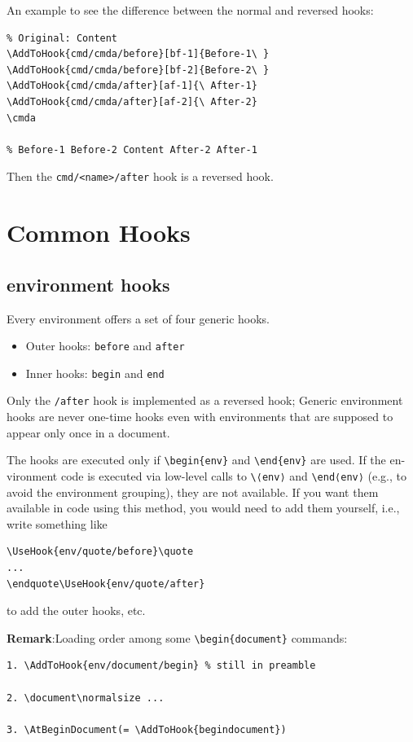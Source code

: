 \documentclass{article}
\newcommand\tbh{\textbackslash}
\newcommand\cmda{Content}
\begin{document}
An example to see the difference between the normal and reversed hooks:
\begin{lstlisting}
% Original: Content
\AddToHook{cmd/cmda/before}[bf-1]{Before-1\ }
\AddToHook{cmd/cmda/before}[bf-2]{Before-2\ }
\AddToHook{cmd/cmda/after}[af-1]{\ After-1}
\AddToHook{cmd/cmda/after}[af-2]{\ After-2}
\cmda

% Before-1 Before-2 Content After-2 After-1
\end{lstlisting}

Then the \texttt{cmd/<name>/after} hook is a reversed hook.

\section{Common Hooks}
\subsection{environment hooks}
Every environment offers a set of four generic hooks. 
\begin{itemize}
  \item Outer hooks: \texttt{before} and \texttt{after}
  \item Inner hooks: \texttt{begin} and \texttt{end}
\end{itemize}

Only the \texttt{/after} hook is implemented as a reversed hook; Generic environment hooks are never one-time
hooks even with environments that are supposed to appear only once in a document.

The hooks are executed only if \texttt{\tbh begin\{env\}} and \texttt{\tbh end\{env\}} are used. If the en-
vironment code is executed via low-level calls to \texttt{\tbh⟨env⟩} and \texttt{\tbh end⟨env⟩} (e.g., to avoid
the environment grouping), they are not available. If you want them available in code
using this method, you would need to add them yourself, i.e., write something like
\begin{lstlisting}
\UseHook{env/quote/before}\quote
...
\endquote\UseHook{env/quote/after}
\end{lstlisting}

to add the outer hooks, etc.

\textbf{Remark}:Loading order among some \verb|\begin{document}| commands:
\begin{lstlisting}
1. \AddToHook{env/document/begin} % still in preamble

2. \document\normalsize ...

3. \AtBeginDocument(= \AddToHook{begindocument})
\end{lstlisting}
\end{document}
